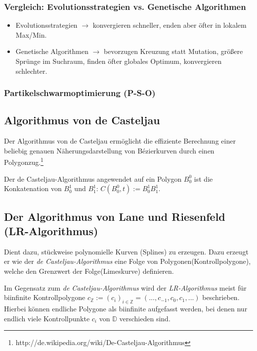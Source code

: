 \subsubsection{Vergleich: Evolutionsstrategien vs. Genetische Algorithmen}
\begin{itemize}
	\item Evolutionsstrategien $\rightarrow$ konvergieren schneller, enden aber öfter in lokalem Max/Min.\\
	\item Genetische Algorithmen $\rightarrow$ bevorzugen Kreuzung statt Mutation, größere Sprünge im Suchraum, finden öfter globales Optimum, konvergieren schlechter.
\end{itemize}

\subsubsection{Partikelschwarmoptimierung (P-S-O)}



\subsection{Algorithmus von de Casteljau}
Der Algorithmus von de Casteljau ermöglicht die effiziente Berechnung einer beliebig genauen Näherungsdarstellung von Bézierkurven durch einen Polygonzug.\footnote{http://de.wikipedia.org/wiki/De-Casteljau-Algorithmus}

Der de Casteljau-Algorithmus angewendet auf ein Polygon \(B_0^0\) ist die Konkatenation von \(B_0^1\) und \(B_1^1\): \(C(B_0^0,t) := B_0^1 B_1^1\).
\text{}\\



\subsection{Der Algorithmus von Lane und Riesenfeld (LR-Algorithmus)}
Dient dazu, stückweise polynomielle Kurven (Splines) zu erzeugen. Dazu erzeugt er wie der \textit{de Casteljau-Algorithmus} eine Folge von Polygonen(Kontrollpolygone), welche den Grenzwert der Folge(Limeskurve) definieren.

Im Gegensatz zum \textit{de Casteljau-Algorithmus} wird der \textit{LR-Algorithmus} meist für biinfinite Kontrollpolygone \(c_\mathbb{Z} := (c_i)_{i \in \mathbb{Z}} = (...,c_{-1},c_0,c_1,...)\) beschrieben. Hierbei können endliche Polygone als biinfinite aufgefasst werden, bei denen nur endlich viele Kontrollpunkte \(c_i\) von \(\mathbb{D}\) verschieden sind.
\text{}\\



